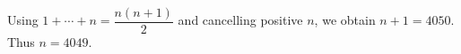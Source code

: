 Using $1+\cdots+n=\dfrac{n(n+1)}{2}$ and cancelling positive $n$, we obtain $n+1=4050$. Thus $\boxed{n=4049}$.
